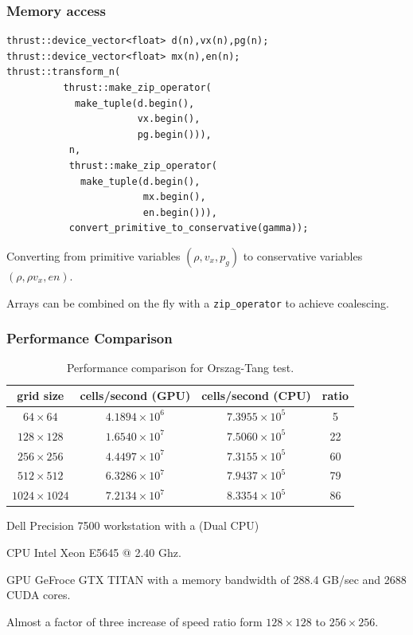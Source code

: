 \documentclass{beamer}
\begin{document}
\begin{frame}[fragile]
\frametitle{Memory access}
\begin{lstlisting}
thrust::device_vector<float> d(n),vx(n),pg(n); 
thrust::device_vector<float> mx(n),en(n); 
thrust::transform_n(
          thrust::make_zip_operator(
            make_tuple(d.begin(),
                       vx.begin(),
                       pg.begin())),
           n,
           thrust::make_zip_operator(
             make_tuple(d.begin(),
                        mx.begin(),
                        en.begin())),
           convert_primitive_to_conservative(gamma));
\end{lstlisting} 
\bei
\item Converting from primitive variables $(\rho,v_x, p_g)$ to conservative variables $(\rho,\rho v_x, en)$.
\item Arrays can be combined on the fly with a \verb+zip_operator+ to achieve coalescing.
\ebi
\end{frame}

\begin{frame}[fragile]
\frametitle{Performance Comparison}
\begin{table}[htbp]%
\caption{Performance comparison for Orszag-Tang \citep{Orszag:1979} test.}
\begin{tabular*}{\textwidth}{@{\extracolsep{\fill}} cccc}
\\ 
\hline 
\hline 
grid size & cells/second (GPU) & cells/second (CPU) & ratio \\
\hline
$64\times64$ & $4.1894\times10^6$ & $7.3955\times10^5$ & 5 \\
$128\times128$ & $1.6540\times10^7$ & $7.5060\times10^5$ & 22 \\
$256\times256$ & $4.4497\times10^7$ & $7.3155\times10^5$ & 60 \\
$512\times512$ & $6.3286\times10^7$ & $7.9437\times10^5$ & 79 \\
$1024\times1024$ & $7.2134\times10^7$ & $8.3354\times10^5$ & 86 \\
\hline
\end{tabular*}
\end{table}

\bei
\item Dell Precision 7500 workstation with a (Dual CPU) 
\item CPU Intel Xeon E5645 @ 2.40 Ghz.
\item GPU GeFroce GTX TITAN with a memory bandwidth of 288.4 GB/sec and 2688 CUDA cores.
\item Almost a factor of three increase of speed ratio form $128\times128$ to $256\times256$.
\ebi
\end{frame}
\end{document}
